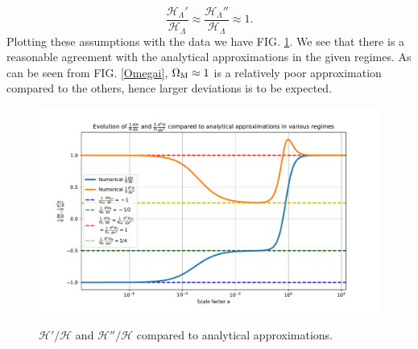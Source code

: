 \documentclass[%
reprint,
 amsmath,amssymb,
 aps,
]{revtex4-2}
\newcommand{\Hp}{\mathcal{H}}
\begin{document}
\vspace{-7.2mm}
\[\frac{\Hp_\Lambda'}{\Hp_\Lambda}\approx\frac{\Hp_\Lambda''}{\Hp_\Lambda}\approx1.\]
Plotting these assumptions with the data we have FIG. \ref{dHpddHp_vs_anal}. We see that there is a reasonable agreement with the analytical approximations in the given regimes. As can be seen from FIG. \ref{Omegai}, $\Omega_{\text M}\approx1$ is a relatively poor approximation compared to the others, hence larger deviations is to be expected.
\begin{figure}[h!]
	\caption{$\Hp'/\Hp$ and $\Hp''/\Hp$ compared to analytical approximations.}
	\includegraphics[width = \linewidth]{Figures/dHpddHp_vs_anal.pdf}
	\label{dHpddHp_vs_anal}
\end{figure}
\end{document}
